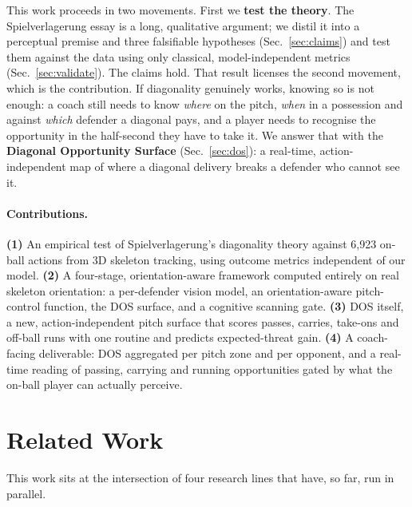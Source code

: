 \documentclass[11pt]{article}
\begin{document}
This work proceeds in two movements. First we \textbf{test the theory}.
The Spielverlagerung essay is a long, qualitative argument; we distil it
into a perceptual premise and three falsifiable hypotheses
(Sec.~\ref{sec:claims}) and test them against the data using only
classical, model-independent metrics (Sec.~\ref{sec:validate}). The claims hold. That result licenses the
second movement, which is the contribution. If diagonality genuinely
works, knowing so is not enough: a coach still needs to know \emph{where}
on the pitch, \emph{when} in a possession and against \emph{which}
defender a diagonal pays, and a player needs to recognise the opportunity
in the half-second they have to take it. We answer that with the
\textbf{Diagonal Opportunity Surface} (Sec.~\ref{sec:dos}): a
real-time, action-independent map of where a diagonal delivery breaks a
defender who cannot see it.

\paragraph{Contributions.} \textbf{(1)} An empirical test of
Spielverlagerung's diagonality theory against 6{,}923 on-ball actions from
3D skeleton tracking, using outcome metrics independent of our model.
\textbf{(2)} A four-stage, orientation-aware framework computed entirely
on real skeleton orientation: a per-defender vision model, an
orientation-aware pitch-control function, the DOS surface, and a cognitive
scanning gate. \textbf{(3)} DOS itself, a new, action-independent pitch
surface that scores passes, carries, take-ons and off-ball runs with one
routine and predicts expected-threat gain. \textbf{(4)} A coach-facing
deliverable: DOS aggregated per pitch zone and per opponent, and a
real-time reading of passing, carrying and running opportunities gated by
what the on-ball player can actually perceive.

\section{Related Work}
\label{sec:related}

This work sits at the intersection of four research lines that have, so
far, run in parallel.
\end{document}
